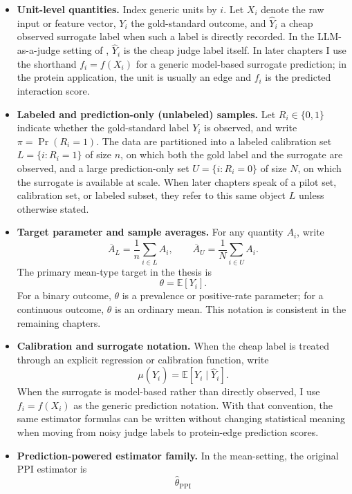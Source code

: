 \begin{itemize}
    \item \textbf{Unit-level quantities.} Index generic units by \(i\). Let \(X_i\) denote the raw input or feature vector, \(Y_i\) the gold-standard outcome, and \(\widehat{Y}_i\) a cheap observed surrogate label when such a label is directly recorded. In the LLM-as-a-judge setting of \textcite{llmjudge_eif}, \(\widehat{Y}_i\) is the cheap judge label itself. In later chapters I use the shorthand \(f_i = f(X_i)\) for a generic model-based surrogate prediction; in the protein application, the unit is usually an edge and \(f_i\) is the predicted interaction score.
    \item \textbf{Labeled and prediction-only (unlabeled) samples.} Let \(R_i \in \{0,1\}\) indicate whether the gold-standard label \(Y_i\) is observed, and write \(\pi = \Pr(R_i = 1)\). The data are partitioned into a labeled calibration set \(L = \{i : R_i = 1\}\) of size \(n\), on which both the gold label and the surrogate are observed, and a large prediction-only set \(U = \{i : R_i = 0\}\) of size \(N\), on which the surrogate is available at scale. When later chapters speak of a pilot set, calibration set, or labeled subset, they refer to this same object \(L\) unless otherwise stated.
    \item \textbf{Target parameter and sample averages.} For any quantity \(A_i\), write
\[
\overline{A}_{L} = \frac{1}{n}\sum_{i \in L} A_i,
\qquad
\overline{A}_{U} = \frac{1}{N}\sum_{i \in U} A_i.
\]
The primary mean-type target in the thesis is
\[
\theta = \mathbb{E}[Y_i].
\]
    For a binary outcome, \(\theta\) is a prevalence or positive-rate parameter; for a continuous outcome, \(\theta\) is an ordinary mean. This notation is consistent in the remaining chapters.
    \item \textbf{Calibration and surrogate notation.} When the cheap label is treated through an explicit regression or calibration function, write
\[
\mu(\widehat{Y}_i) = \mathbb{E}[Y_i \mid \widehat{Y}_i].
\]
    When the surrogate is model-based rather than directly observed, I use \(f_i = f(X_i)\) as the generic prediction notation. With that convention, the same estimator formulas can be written without changing statistical meaning when moving from noisy judge labels to protein-edge prediction scores.
    \item \textbf{Prediction-powered estimator family.} In the mean-setting, the original PPI estimator is
\begin{equation}
\widehat{\theta}_{\mathrm{PPI}}

\end{equation}
\end{itemize}
